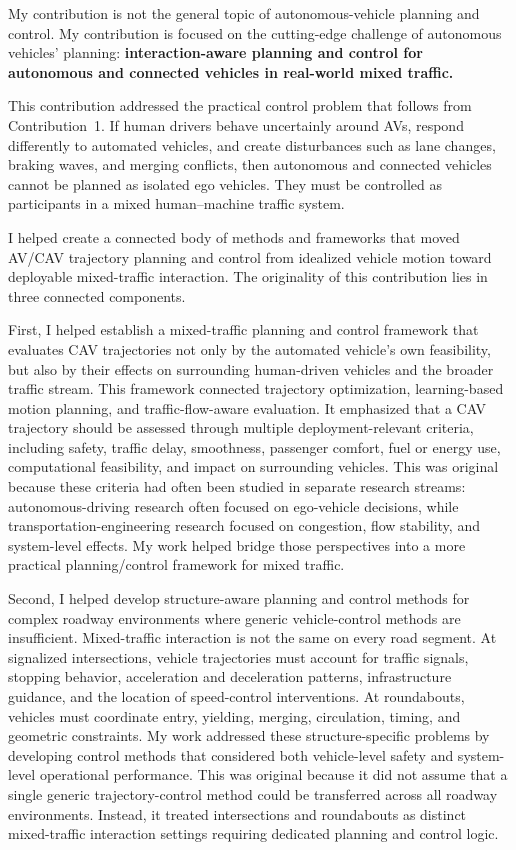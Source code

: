 \documentclass[11pt,letterpaper]{article}
\begin{document}
My contribution is not the general topic of autonomous-vehicle planning and control. My contribution is focused on the cutting-edge challenge of autonomous vehicles' planning: \textbf{interaction-aware planning and control for autonomous and connected vehicles in real-world mixed traffic.}

This contribution addressed the practical control problem that follows from Contribution~1. If human drivers behave uncertainly around AVs, respond differently to automated vehicles, and create disturbances such as lane changes, braking waves, and merging conflicts, then autonomous and connected vehicles cannot be planned as isolated ego vehicles. They must be controlled as participants in a mixed human--machine traffic system.

I helped create a connected body of methods and frameworks that moved AV/CAV trajectory planning and control from idealized vehicle motion toward deployable mixed-traffic interaction. The originality of this contribution lies in three connected components.

First, I helped establish a mixed-traffic planning and control framework that evaluates CAV trajectories not only by the automated vehicle's own feasibility, but also by their effects on surrounding human-driven vehicles and the broader traffic stream. This framework connected trajectory optimization, learning-based motion planning, and traffic-flow-aware evaluation. It emphasized that a CAV trajectory should be assessed through multiple deployment-relevant criteria, including safety, traffic delay, smoothness, passenger comfort, fuel or energy use, computational feasibility, and impact on surrounding vehicles. This was original because these criteria had often been studied in separate research streams: autonomous-driving research often focused on ego-vehicle decisions, while transportation-engineering research focused on congestion, flow stability, and system-level effects. My work helped bridge those perspectives into a more practical planning/control framework for mixed traffic.

Second, I helped develop structure-aware planning and control methods for complex roadway environments where generic vehicle-control methods are insufficient. Mixed-traffic interaction is not the same on every road segment. At signalized intersections, vehicle trajectories must account for traffic signals, stopping behavior, acceleration and deceleration patterns, infrastructure guidance, and the location of speed-control interventions. At roundabouts, vehicles must coordinate entry, yielding, merging, circulation, timing, and geometric constraints. My work addressed these structure-specific problems by developing control methods that considered both vehicle-level safety and system-level operational performance. This was original because it did not assume that a single generic trajectory-control method could be transferred across all roadway environments. Instead, it treated intersections and roundabouts as distinct mixed-traffic interaction settings requiring dedicated planning and control logic.
\end{document}

